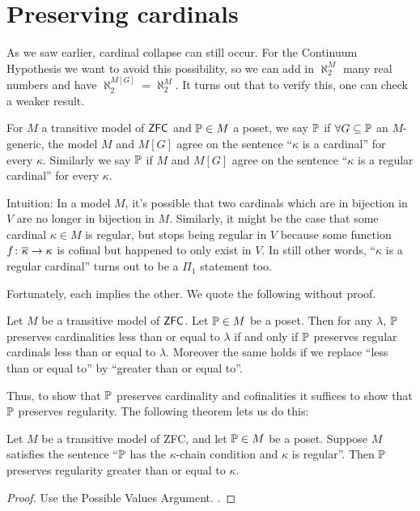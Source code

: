 \section{Preserving cardinals}
As we saw earlier, cardinal collapse can still occur.
For the Continuum Hypothesis we want to avoid this possibility,
so we can add in $\aleph_2^M$ many real numbers and have $\aleph_2^{M[G]} = \aleph_2^M$.
It turns out that to verify this, one can check a weaker result.

\begin{definition}
	For $M$ a transitive model of $\mathsf{ZFC}$ and $\mathbb P \in M$ a poset,
	we say $\mathbb P$  if
	$\forall G \subseteq \mathbb P$ an $M$-generic,
	the model $M$ and $M[G]$ agree on the sentence ``$\kappa$ is a cardinal'' for every $\kappa$.
	Similarly we say $\mathbb P$  if $M$ and $M[G]$
	agree on the sentence ``$\kappa$ is a regular cardinal'' for every $\kappa$.
\end{definition}
Intuition:
In a model $M$, it's possible that two cardinals which are in bijection in $V$ are no longer in bijection in $M$.
Similarly, it might be the case that some cardinal $\kappa \in M$ is regular,
but stops being regular in $V$ because some function $f \colon \overline\kappa \to \kappa$ is cofinal but happened to only exist in $V$.
In still other words, ``$\kappa$ is a regular cardinal'' turns out to be a $\Pi_1$ statement too.

Fortunately, each implies the other.
We quote the following without proof.
\begin{proposition}
	Let $M$ be a transitive model of $\mathsf{ZFC}$.
	Let $\mathbb P \in M$ be a poset.
	Then for any $\lambda$,
		$\mathbb P$ preserves cardinalities less than or equal to $\lambda$
		if and only if $\mathbb P$ preserves regular cardinals less than or equal to $\lambda$.
	Moreover the same holds if we replace ``less than or equal to''
	by ``greater than or equal to''.
\end{proposition}

Thus, to show that $\mathbb P$ preserves cardinality and cofinalities
it suffices to show that $\mathbb P$ preserves regularity.
The following theorem lets us do this:
\begin{theorem}
	Let $M$ be a transitive model of ZFC, and let $\mathbb P \in M$ be a poset.
	Suppose $M$ satisfies the sentence ``$\mathbb P$ has the $\kappa$-chain condition and $\kappa$ is regular''.
	Then $\mathbb P$ preserves regularity greater than or equal to $\kappa$.
\end{theorem}
\begin{proof}
	Use the Possible Values Argument.
	.
\end{proof}

